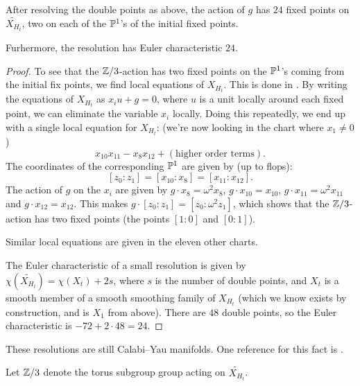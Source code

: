 \begin{lemma}
After resolving the double points as above, the action of $g$ has $24$ fixed points on $\widetilde{X_{H_t}}$, two on each of the $\P^1$'s of the initial fixed points.

Furhermore, the resolution has Euler characteristic $24$.
\end{lemma}
\begin{proof}
To see that the $\Z/3$-action has two fixed points on the $\P^1$'s coming from the initial fix points, we find local equations of $X_{H_t}$. This is done in \MM. By writing the equations of $X_{H_t}$ as $x_iu+g=0$, where $u$ is a unit locally around each fixed point, we can eliminate the variable $x_i$ locally. Doing this repeatedly, we end up with a single local equation for $X_{H_t}$: (we're now looking in the chart where $x_1 \neq 0$)
\[
x_{10}x_{11}-x_8x_{12} + (\text{higher order terms}).
\]
The coordinates of the corresponding $\P^1$ are given by (up to flops):
\[
[z_0:z_1] = [x_{10}:x_8] = [x_{11}:x_{12}].
\]
The action of $g$ on the $x_i$ are given by $g \cdot x_8 = \omega^2 x_8$, $g \cdot x_{10} = x_{10}$, $g \cdot x_{11} = \omega^2 x_{11}$ and $g \cdot x_{12} = x_{12}$. This makes $ g \cdot [z_0:z_1] = [z_0:\omega^2 z_1]$, which shows that the $\Z/3$-action has two fixed points (the points $[1:0]$ and $[0:1]$).

Similar local equations are given in the eleven other charts.

The Euler characteristic of a small resolution is given by $\chi(\widetilde{X_{H_t}}) = \chi(X_t) + 2s$, where $s$ is the number of double points, and $X_t$ is a smooth member of a smooth smoothing family of $X_{H_t}$ (which we know exists by construction, and is $X_1$ from above). There are $48$ double points, so the Euler characteristic is $-72+2 \cdot 48 = 24$.
\end{proof}

These resolutions are still Calabi--Yau manifolds. One reference for this fact is \cite{clemens_double}. 

Let $\Z/3$ denote the torus subgroup group acting on $\widetilde{X_{H_t}}$. 

